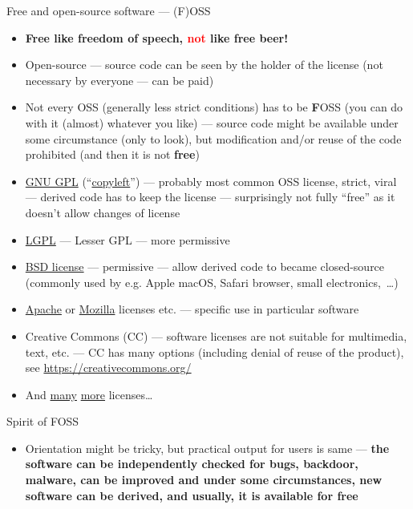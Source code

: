 \documentclass[compress, xelatex, 11pt, xcolor=svgnames, aspectratio=169,
	hyperref={
		bookmarks=true,
		unicode=true,
		colorlinks=true,
		pdftitle={Linux, command line and MetaCentrum},
		plainpages=false,
		pdfauthor={Vojtech Zeisek},
		pdfsubject={Course about use of Linux command line, writing shell scripts and using MetaCentrum of CESNET},
		pdfcreator={XeLaTeX},
		pdfkeywords={Linux, GNU, BASH, shell, command line, MetaCentrum},
		linkcolor=DarkRed, %
		anchorcolor=DarkBlue, %
		citecolor=Indigo, %
		filecolor=NavyBlue, %
		menucolor=DarkMagenta, %
		urlcolor=DarkBlue, %
		},
	url={hyphens, lowtilde} %
	]{beamer}
\renewcommand{\alert}[1]{\textcolor{red}{#1}}
\begin{document}
\begin{frame}[allowframebreaks]{Free and open-source software --- (F)OSS}
	\begin{itemize}
		\item \textbf{Free like freedom of speech, \alert{not} like free beer!}
		\item Open-source --- source code can be seen by the holder of the license (not necessary by everyone --- can be paid)
		\item Not every OSS (generally less strict conditions) has to be \textbf{F}OSS (you can do with it (almost) whatever you like) --- source code might be available under some circumstance (only to look), but modification and/or reuse of the code prohibited (and then it is not \textbf{free})
		\item \href{https://www.gnu.org/licenses/gpl-3.0.html}{GNU GPL} (\enquote{\href{https://www.gnu.org/copyleft/}{copyleft}}) --- probably most common OSS license, strict, viral --- derived code has to keep the license --- surprisingly not fully \enquote{free} as it doesn't allow changes of license
		\item \href{https://www.gnu.org/licenses/lgpl-3.0.en.html}{LGPL} --- Lesser GPL --- more permissive
		\item \href{https://en.wikipedia.org/wiki/BSD_licenses}{BSD license} --- permissive --- allow derived code to became closed-source (commonly used by e.g. Apple macOS, Safari browser, small electronics,~\ldots)
		\item \href{https://www.apache.org/licenses/}{Apache} or \href{https://www.mozilla.org/MPL/}{Mozilla} licenses etc. --- specific use in particular software
		\item Creative Commons (CC) --- software licenses are not suitable for multimedia, text, etc. --- CC has many options (including denial of reuse of the product), see \url{https://creativecommons.org/}
		\item And \href{https://en.wikipedia.org/wiki/Comparison_of_free_and_open-source_software_licenses}{many} \href{https://opensource.org/licenses}{more} licenses\ldots
	\end{itemize}
	\begin{block}{Spirit of FOSS}
		\begin{itemize}
			\item Orientation might be tricky, but practical output for users is same --- \textbf{the software can be independently checked for bugs, backdoor, malware, can be improved and under some circumstances, new software can be derived, and usually, it is available for free}

\end{itemize}
\end{block}
\end{frame}
\end{document}
